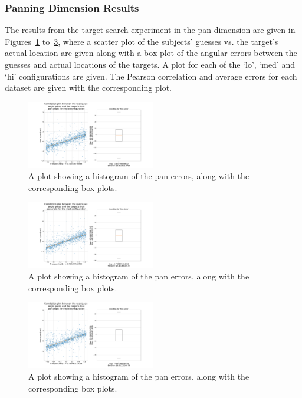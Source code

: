 \documentclass[format=sigconf, review=true, screen=true, anonymous=true]{acmart}
\begin{document}
\subsubsection{Panning Dimension Results}

The results from the target search experiment in the pan dimension are given in Figures~\ref{fig:pan-err-lo} to~\ref{fig:pan-err-hi}, where a scatter plot of the subjects' guesses vs. the target's actual location are given along with a box-plot of the angular errors between the guesses and actual locations of the targets. A plot for each of the `lo', `med' and `hi' configurations are given. The Pearson correlation and average errors for each dataset are given with the corresponding plot. 

\begin{figure}
  \centering
  \includegraphics[width=0.5\textwidth]{figures/pan_err_lo.png}
  \caption{A plot showing a histogram of the pan errors, along with the corresponding box plots. }
  \label{fig:pan-err-lo}
\end{figure}

\begin{figure}
  \centering
  \includegraphics[width=0.5\textwidth]{figures/pan_err_med.png}
  \caption{A plot showing a histogram of the pan errors, along with the corresponding box plots. }
  \label{fig:pan-err-med}
\end{figure}

\begin{figure}
  \centering
  \includegraphics[width=0.5\textwidth]{figures/pan_err_hi.png}
  \caption{A plot showing a histogram of the pan errors, along with the corresponding box plots. }
  \label{fig:pan-err-hi}
\end{figure}
\end{document}
